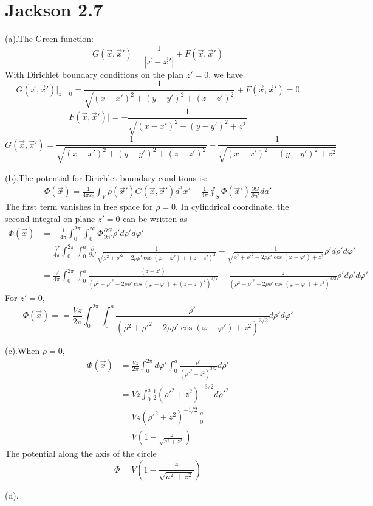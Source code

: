 \documentclass{article}
\begin{document}
\section*{Jackson 2.7}\par
(a).The Green function:
\[ G(\vec x,\vec x')=\frac{1}{|\vec x-\vec x'|}+F(\vec x,\vec x') \]
With Dirichlet boundary conditions on the plan $z'=0$, we have
\[G(\vec x,\vec x')|_{z=0}=\frac{1}{\sqrt{(x-x')^2+(y-y')^2+(z-z')^2}}+F(\vec x,\vec x')=0 \]
\[ F(\vec x,\vec x')|=-\frac{1}{\sqrt{(x-x')^2+(y-y')^2+z^2}} \]
\[\boxed{ G(\vec x,\vec x')=\frac{1}{\sqrt{(x-x')^2+(y-y')^2+(z-z')^2}}-\frac{1}{\sqrt{(x-x')^2+(y-y')^2+z^2}}} \]\par
(b).The potential for Dirichlet boundary conditions is:
\begin{align*}
  \Phi(\vec x)=\frac{1}{4\pi\varepsilon_0}\int_V\rho(\vec x')G(\vec x,\vec x')d^3x'-\frac{1}{4\pi}\oint_S\Phi(\vec x')\frac{\partial G}{\partial n'}da'
\end{align*}
The first term vanishes in free space for $\rho=0$. In cylindrical coordinate, the second integral on plane $z'=0$ can be written as
 \begin{align*}
   \Phi(\vec x)&=-\frac{1}{4\pi}\int_0^{2\pi}\int_0^\infty\Phi\frac{\partial G}{\partial n'}\rho' d\rho' d\varphi'\\
               &=\frac{V}{4\pi}\int_0^{2\pi}\int_0^a\frac{\partial}{\partial z'}\frac{1}{\sqrt{\rho^2+\rho'^2-2\rho\rho'\cos{(\varphi-\varphi')}+(z-z')^2}}-\frac{1}{\sqrt{\rho^2+\rho'^2-2\rho\rho'\cos{(\varphi-\varphi')}+z^2}}\rho' d\rho' d\varphi'\\
              &=\frac{V}{4\pi}\int_0^{2\pi}\int_0^{a}\frac{(z-z')}{(\rho^2+\rho'^2-2\rho\rho'\cos{(\varphi-\varphi')}+(z-z')^2)^{3/2}}-\frac{z}{(\rho^2+\rho'^2-2\rho\rho'\cos{(\varphi-\varphi')}+z^2)^{3/2}}\rho' d\rho' d\varphi'
 \end{align*}
 For $z'=0$,
 \[\boxed{ \Phi(\vec x)==\frac{Vz}{2\pi}\int_0^{2\pi}\int_0^a\frac{\rho'}{(\rho^2+\rho'^2-2\rho\rho'\cos{(\varphi-\varphi')}+z^2)^{3/2}} d\rho' d\varphi'} \]\par
 (c).When $\rho=0$,
 \begin{align*}
   \Phi(\vec x)&=\frac{Vz}{2\pi}\int_0^{2\pi}d\varphi'\int_0^a\frac{\rho'}{(\rho'^2+z^2)^{3/2}}d\rho'\\
               &=Vz\int_0^a\frac{1}{2}(\rho'^2+z^2)^{-3/2}d\rho'^2\\
               &=Vz(\rho'^2+z^2)^{-1/2}|^a_0\\
               &=V(1-\frac{z}{\sqrt{a^2+z^2}})              
 \end{align*}
 The potential along the axis of the circle
 \[ \boxed{\Phi=V(1-\frac{z}{\sqrt{a^2+z^2}})} \] \par
(d).
\end{document}
